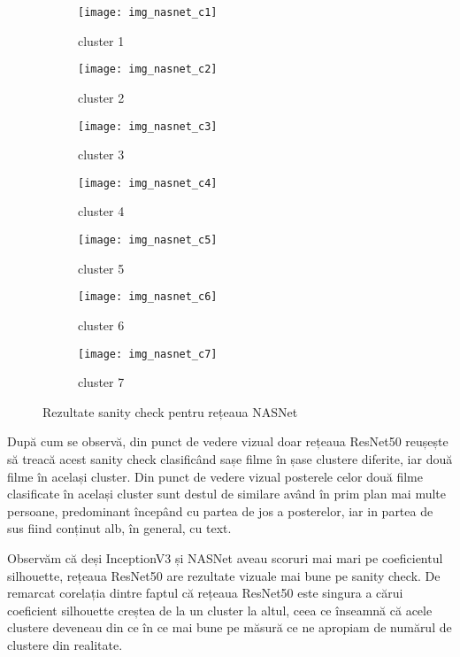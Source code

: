 \begin{figure}[!h]
  \centering
  \begin{subfigure}[b]{0.48\textwidth}
    \texttt{[image: img\_nasnet\_c1]}
    \caption{cluster 1}
  \end{subfigure}
  \hfill
  \begin{subfigure}[b]{0.48\textwidth}
    \texttt{[image: img\_nasnet\_c2]}
    \caption{cluster 2}
  \end{subfigure}
   \hfill
  \begin{subfigure}[b]{0.48\textwidth}
    \texttt{[image: img\_nasnet\_c3]}
    \caption{cluster 3}
  \end{subfigure}
  \hfill
  \begin{subfigure}[b]{0.48\textwidth}
    \texttt{[image: img\_nasnet\_c4]}
    \caption{cluster 4}
  \end{subfigure}
  \hfill
  \begin{subfigure}[b]{0.48\textwidth}
    \texttt{[image: img\_nasnet\_c5]}
    \caption{cluster 5}
  \end{subfigure}
  \hfill
  \begin{subfigure}[b]{0.48\textwidth}
    \texttt{[image: img\_nasnet\_c6]}
    \caption{cluster 6}
  \end{subfigure}
    \hfill
  \begin{subfigure}[b]{0.48\textwidth}
    \texttt{[image: img\_nasnet\_c7]}
    \caption{cluster 7}
  \end{subfigure}
  \caption[Rezultate sanity check pentru rețeaua NASNet]{Rezultate sanity check pentru rețeaua NASNet}
\end{figure}

După cum se observă, din punct de vedere vizual doar rețeaua ResNet50 reușește să treacă acest sanity check clasificând sașe filme în șase clustere diferite, iar două filme în același cluster. Din punct de vedere vizual posterele celor două filme clasificate în același cluster sunt destul de similare având în prim plan mai multe persoane, predominant începând cu partea de jos a posterelor, iar in partea de sus fiind conținut alb, în general, cu text.

Observăm că deși InceptionV3 și NASNet aveau scoruri mai mari pe coeficientul silhouette, rețeaua ResNet50 are rezultate vizuale mai bune pe sanity check. De remarcat corelația dintre faptul că rețeaua ResNet50 este singura a cărui coeficient silhouette creștea de la un cluster la altul, ceea ce înseamnă că acele clustere deveneau din ce în ce mai bune pe măsură ce ne apropiam de numărul de clustere din realitate.


